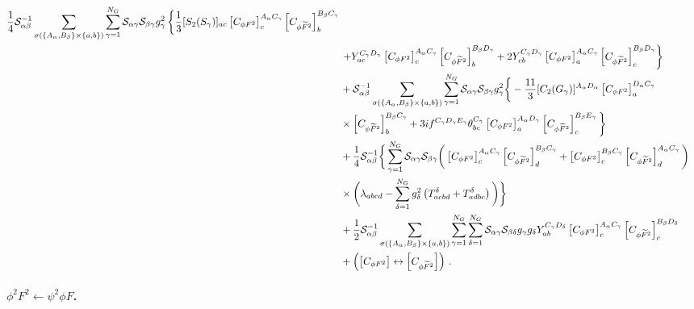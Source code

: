 \begin{align}
    \frac{1}{4} \mathcal S_{\alpha\beta}^{-1} \sum_{\sigma(\{A_\alpha,B_\beta\}\times \{a,b\})} \sum_{\gamma=1}^{N_G}\mathcal S_{\alpha\gamma}\mathcal S_{\beta\gamma} g_\gamma^2 \left\{\frac{1}{3}[S_2(S_\gamma)]_{ac}\left[C_{\phi F^2}\right]_{c}^{A_\alpha C_\gamma} \left[C_{\phi \widetilde{F}^2}\right]_{b}^{B_\beta C_\gamma}\right.\nonumber \\
    &\left.+ Y_{ac}^{C_\gamma D_\gamma} \left[C_{\phi F^2}\right]_{c}^{A_\alpha C_\gamma} \left[C_{\phi \widetilde{F}^2}\right]_{b}^{B_\beta D_\gamma} + 2 Y_{cb}^{C_\gamma D_\gamma} \left[C_{\phi F^2}\right]_{a}^{A_\alpha C_\gamma} \left[C_{\phi \widetilde{F}^2}\right]_{c}^{B_\beta D_\gamma} \right\}\nonumber\\
    &+\mathcal S_{\alpha\beta}^{-1}\sum_{\sigma(\{A_\alpha,B_\beta\}\times \{a,b\})}\sum_{\gamma=1}^{N_G}\mathcal S_{\alpha\gamma}\mathcal S_{\beta\gamma} g_\gamma^2\bigg\{-\frac{11}{3} [C_2(G_\gamma)]^{A_\alpha D_\alpha}\left[C_{\phi F^2}\right]_{a}^{D_\alpha C_\gamma} \nonumber \\
    &\times\left[C_{\phi \widetilde{F}^2}\right]_{b}^{B_\beta C_\gamma}+ 3i f^{C_\gamma D_\gamma E_\gamma} \theta^{C_\gamma}_{bc} \left[C_{\phi F^2}\right]_{a}^{A_\alpha D_\gamma} \left[C_{\phi \widetilde{F}^2}\right]_{c}^{B_\beta E_\gamma}\bigg\}\nonumber\\
    &+\frac{1}{4}\mathcal S_{\alpha\beta}^{-1}\bigg\{\sum_{\gamma=1}^{N_G}\mathcal S_{\alpha\gamma}\mathcal S_{\beta\gamma}\bigg(\left[C_{\phi F^2}\right]_{c}^{A_\alpha C_\gamma} \left[C_{\phi \widetilde{F}^2}\right]_{d}^{B_\beta C_\gamma}+\left[C_{\phi F^2}\right]_{c}^{B_\beta C_\gamma} \left[C_{\phi \widetilde{F}^2}\right]_{d}^{A_\alpha C_\gamma}\bigg)\nonumber \\
    &\times \bigg(\lambda_{abcd}-\sum_{\delta=1}^{N_G}g_\delta^2\left(T^\delta_{acbd}+T^\delta_{adbc}\right)\bigg)\bigg\}\nonumber\\
    & + \frac{1}{2}\mathcal S_{\alpha\beta}^{-1} \sum_{\sigma(\{A_\alpha,B_\beta\}\times \{a,b\})}\sum_{\gamma=1}^{N_G}\sum_{\delta=1}^{N_G}\mathcal S_{\alpha\gamma}\mathcal S_{\beta\delta}g_\gamma g_\delta Y_{ab}^{C_\gamma D_\delta} \left[C_{\phi F^2}\right]_{c}^{A_\alpha C_\gamma} \left[C_{\phi \widetilde{F}^2}\right]_{c}^{B_\beta D_\delta}\nonumber\\
    & + \left(\left[C_{\phi F^2}\right]\leftrightarrow \left[C_{\phi \widetilde{F}^2}\right]\right)\,.
    \label{eq:phi2F2-phiF2xphiF2_CPV}
\end{align}

\paragraph{$\phi^2F^2 \leftarrow \psi^2 \phi F$.}

